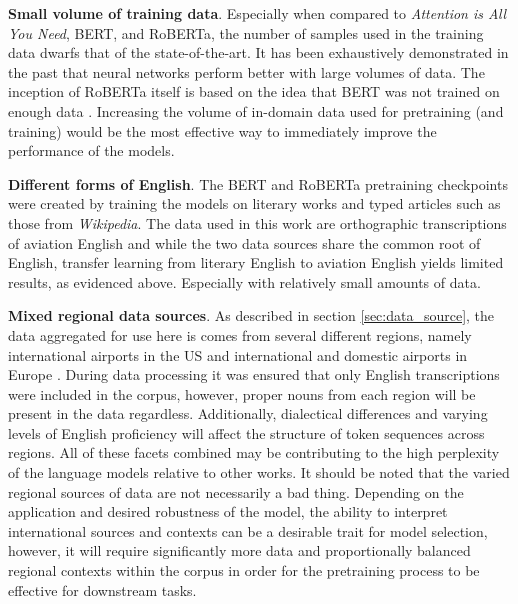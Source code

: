 \documentclass[12pt]{article}
\begin{document}
\noindent
\textbf{Small volume of training data}. Especially when compared to \textit{Attention is All You Need}, BERT, and RoBERTa,
\cite{vaswani_attention_2017,devlin_bert_2019,liu_roberta_2019} the number of samples used in the training data dwarfs that of the state-of-the-art.
It has been exhaustively demonstrated in the past that neural networks perform better with large volumes of data. The inception of RoBERTa itself is
based on the idea that BERT was not trained on enough data \cite{liu_roberta_2019}. Increasing the volume of in-domain data used for pretraining
(and training) would be the most effective way to immediately improve the performance of the models.

\noindent
\textbf{Different forms of English}. The BERT and RoBERTa pretraining checkpoints were created by training the models on literary works and typed
articles such as those from \textit{Wikipedia}. The data used in this work are orthographic transcriptions of aviation English and while the two data
sources share the common root of English, transfer learning from literary English to aviation English yields limited results, as evidenced above.
Especially with relatively small amounts of data.

\noindent
\textbf{Mixed regional data sources}. As described in section \ref{sec:data_source}, the data aggregated for use here is comes from several different
regions, namely international airports in the US \cite{godfrey_air_1994} and international and domestic airports in Europe
\cite{smidl_air_2019,hofbauer_atcosim_2008,szoke_detecting_2021}. During data processing it was ensured that only English transcriptions were included
in the corpus, however, proper nouns from each region will be present in the data regardless. Additionally, dialectical differences and varying levels
of English proficiency will affect the structure of token sequences across regions. All of these facets combined may be contributing to the high
perplexity of the language models relative to other works. It should be noted that the varied regional sources of data are not necessarily a bad
thing. Depending on the application and desired robustness of the model, the ability to interpret international sources and contexts can be a
desirable trait for model selection, however, it will require significantly more data and proportionally balanced regional contexts within the corpus
in order for the pretraining process to be effective for downstream tasks.
\end{document}
